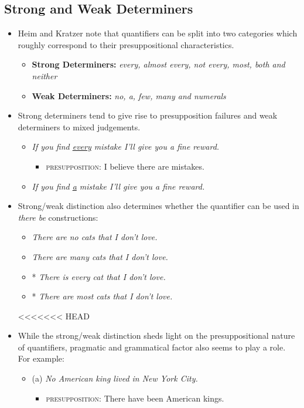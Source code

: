 \documentclass[a4paper]{article}
\begin{document}
\subsection{Strong and Weak Determiners}
\begin{itemize}
\item Heim and Kratzer note that quantifiers can be split into two categories which roughly correspond to their presuppositional characteristics.
\begin{itemize}
\item \textbf{Strong Determiners:} \emph{every, almost every, not every, most, both and neither}
\item \textbf{Weak Determiners:} \emph{no, a, few, many and numerals}
\end{itemize}
\item Strong determiners tend to give rise to presupposition failures and weak determiners to mixed judgements.
\begin{itemize}
	\item \emph{If you find \underline{every} mistake I'll give you a fine reward.} 
\begin{itemize}
\item \textsc{presupposition:} I believe there are mistakes.
\end{itemize}
	\item \emph{If you find \underline{a} mistake I'll give you a fine reward.}
\end{itemize}
\item Strong/weak distinction also determines whether the quantifier can be used in \emph{there be} constructions:
\begin{itemize}
\item \emph{There are no cats that I don't love.}
\item \emph{There are many cats that I don't love.}
\item * \emph{There is every cat that I don't love.}
\item * \emph{There are most cats that I don't love.}
\end{itemize}
<<<<<<< HEAD
\item While the strong/weak distinction sheds light on the presuppositional nature of quantifiers, pragmatic and grammatical factor also seems to play a role. For example:
\begin{itemize}
\item (a) \emph{No American king lived in New York City.} 
\begin{itemize}
\item \textsc{presupposition:} There have been American kings.

\end{itemize}
\end{itemize}
\end{itemize}
\end{document}
